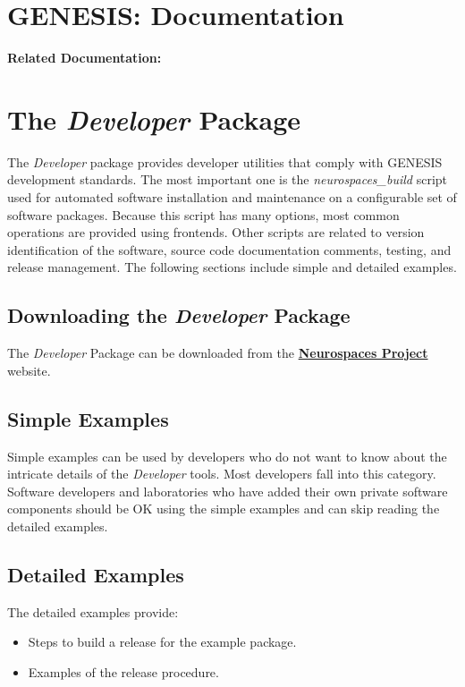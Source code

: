 \documentclass[12pt]{article}
\begin{document}
\section*{GENESIS: Documentation}

{\bf Related Documentation:}

\section*{The {\it Developer} Package}

The {\it Developer} package provides developer utilities that comply with GENESIS development standards. The most important one is the {\it
  neurospaces\_build} script used for automated software installation and maintenance on a configurable set of software packages.  Because
this script has many options, most common operations are provided using frontends.  Other scripts are related to version identification of the software, source code documentation comments, testing, and release management. The following sections include simple and detailed examples. 

\subsection*{Downloading the  {\it Developer} Package}
The {\it Developer} Package can be downloaded from the \href{http://sourceforge.net/projects/neurospaces/files/}{\bf Neurospaces Project} website.

\subsection*{Simple Examples}
Simple examples can be used by developers who do not want to know about the intricate details of the {\it Developer} tools.  Most developers fall into this category. Software developers and laboratories who have added their own private software components should be OK using the simple examples and can skip reading the detailed examples.

\subsection*{Detailed Examples}
The detailed examples provide:
\begin{itemize}
   \item[]Steps to build a release for the example {\tt <your-software>} package.
   \item[]Examples of the release procedure.
\end{itemize}
\end{document}
